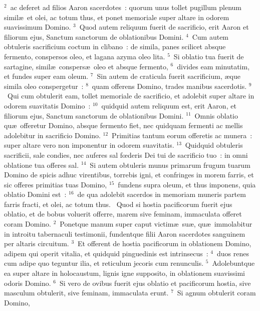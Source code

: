 ${}^{2}$~ac deferet ad filios Aaron sacerdotes~: quorum unus tollet pugillum plenum simil\ae\ et olei, ac totum thus, et ponet memoriale super altare in odorem suavissimum Domino.
${}^{3}$~Quod autem reliquum fuerit de sacrificio, erit Aaron et filiorum ejus, Sanctum sanctorum de oblationibus Domini.
${}^{4}$~Cum autem obtuleris sacrificium coctum in clibano~: de simila, panes scilicet absque fermento, conspersos oleo, et lagana azyma oleo lita.
${}^{5}$~Si oblatio tua fuerit de sartagine, simil\ae\ conspers\ae\ oleo et absque fermento,
${}^{6}$~divides eam minutatim, et fundes super eam oleum.
${}^{7}$~Sin autem de craticula fuerit sacrificium, \ae que simila oleo conspergetur~:
${}^{8}$~quam offerens Domino, trades manibus sacerdotis.
${}^{9}$~Qui cum obtulerit eam, tollet memoriale de sacrificio, et adolebit super altare in odorem suavitatis Domino~:
${}^{10}$~quidquid autem reliquum est, erit Aaron, et filiorum ejus, Sanctum sanctorum de oblationibus Domini.
${}^{11}$~Omnis oblatio qu\ae\ offeretur Domino, absque fermento fiet, nec quidquam fermenti ac mellis adolebitur in sacrificio Domino.
${}^{12}$~Primitias tantum eorum offeretis ac munera~: super altare vero non imponentur in odorem suavitatis.
${}^{13}$~Quidquid obtuleris sacrificii, sale condies, nec auferes sal fœderis Dei tui de sacrificio tuo~: in omni oblatione tua offeres sal.
${}^{14}$~Si autem obtuleris munus primarum frugum tuarum Domino de spicis adhuc virentibus, torrebis igni, et confringes in morem farris, et sic offeres primitias tuas Domino,
${}^{15}$~fundens supra oleum, et thus imponens, quia oblatio Domini est~:
${}^{16}$~de qua adolebit sacerdos in memoriam muneris partem farris fracti, et olei, ac totum thus.
~\lettrine[lines=10,image=true,loversize=0.05,lraise=-0.03]{Q}{}uod si hostia pacificorum fuerit ejus oblatio, et de bobus voluerit offerre, marem sive feminam, immaculata offeret coram Domino.
${}^{2}$~Ponetque manum super caput victim\ae\ su\ae , qu\ae\ immolabitur in introitu tabernaculi testimonii, fundentque filii Aaron sacerdotes sanguinem per altaris circuitum.
${}^{3}$~Et offerent de hostia pacificorum in oblationem Domino, adipem qui operit vitalia, et quidquid pinguedinis est intrinsecus~:
${}^{4}$~duos renes cum adipe quo teguntur ilia, et reticulum jecoris cum renunculis.
${}^{5}$~Adolebuntque ea super altare in holocaustum, lignis igne supposito, in oblationem suavissimi odoris Domino.
${}^{6}$~Si vero de ovibus fuerit ejus oblatio et pacificorum hostia, sive masculum obtulerit, sive feminam, immaculata erunt.
${}^{7}$~Si agnum obtulerit coram Domino,
